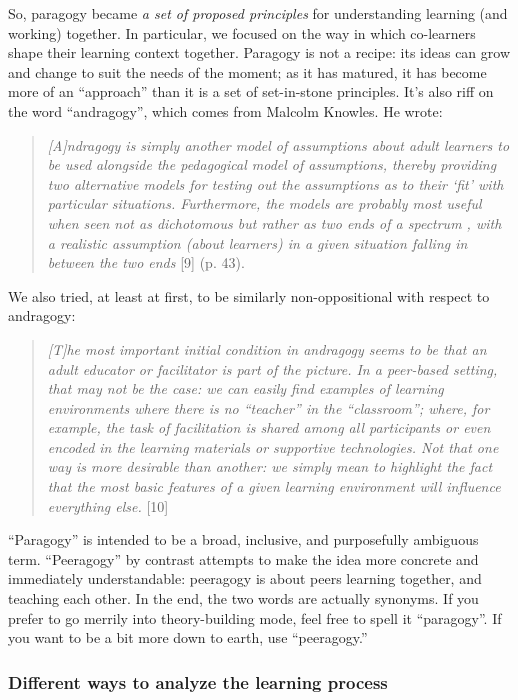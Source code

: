 So, paragogy became \emph{a set of proposed principles} for
understanding learning (and working) together. In particular, we focused
on the way in which co-learners shape their learning context together.
Paragogy is not a recipe: its ideas can grow and change to suit the
needs of the moment; as it has matured, it has become more of an
``approach'' than it is a set of set-in-stone principles. It's also riff
on the word ``andragogy'', which comes from Malcolm Knowles. He wrote:

\begin{quote}
\emph{{[}A{]}ndragogy is simply another model of assumptions about adult
learners to be used alongside the pedagogical model of assumptions,
thereby providing two alternative models for testing out the assumptions
as to their `fit' with particular situations. Furthermore, the models
are probably most useful when seen not as dichotomous but rather as two
ends of a spectrum , with a realistic assumption (about learners) in a
given situation falling in between the two ends} {[}9{]} (p. 43).
\end{quote}

We also tried, at least at first, to be similarly non-oppositional with
respect to andragogy:

\begin{quote}
\emph{{[}T{]}he most important initial condition in andragogy seems to
be that an adult educator or facilitator is part of the picture. In a
peer-based setting, that may not be the case: we can easily find
examples of learning environments where there is no ``teacher'' in the
``classroom''; where, for example, the task of facilitation is shared
among all participants or even encoded in the learning materials or
supportive technologies. Not that one way is more desirable than
another: we simply mean to highlight the fact that the most basic
features of a given learning environment will influence everything
else.} {[}10{]}
\end{quote}

``Paragogy'' is intended to be a broad, inclusive, and purposefully
ambiguous term. ``Peeragogy'' by contrast attempts to make the idea more
concrete and immediately understandable: peeragogy is about peers
learning together, and teaching each other. In the end, the two words
are actually synonyms. If you prefer to go merrily into theory-building
mode, feel free to spell it ``paragogy''. If you want to be a bit more
down to earth, use ``peeragogy.''

\subsubsection{Different ways to analyze the learning process}

